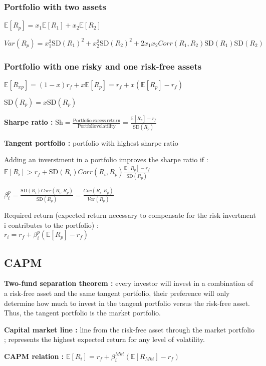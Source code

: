\documentclass[a4paper,twocolumn]{article}
\newcommand{\E}[1] {\mathbb{E} [#1] }
\newcommand{\SD} {\mathrm{SD}}
\begin{document}
\subsubsection*{Portfolio with two assets}

$\E{R_p} = x_1 \E{R_1} + x_2 \E{R_2}$

$Var(R_p) = x_1^2 \SD(R_1)^2 + x_2^2 \SD(R_2)^2 + 2 x_1 x_2 Corr(R_1, R_2) \SD(R_1) \SD(R_2)$

\subsubsection*{Portfolio with one risky and one risk-free assets}

$\E{R_{xp}} = (1-x) r_f + x \E{R_p} = r_f + x (\E{R_p} - r_f)$

$\SD(R_p) = x \SD(R_p)$

\textbf{Sharpe ratio :} $\mathrm{Sh} = \frac{\mathrm{Portfolio\ excess\ return}}{\mathrm{Portfolio volatility}} = \frac{\E{R_p} - r_f}{\SD(R_p)}$ 

\textbf{Tangent portfolio :} portfolio with highest sharpe ratio

Adding an inverstment in a portfolio improves the sharpe ratio if :\\
$\E{R_i} > r_f + \SD(R_i) Corr(R_i, R_p) \frac{\E{R_p} - r_f}{\SD(R_p)}$

$\beta_i^p = \frac{\SD(R_i) Corr(R_i, R_p)}{\SD(R_p)} = \frac{Cov(R_i, R_p)}{Var(R_p)}$

Required return (expected return necessary to compensate for the risk  invertment i contributes to the portfolio) :\\
$r_i = r_f + \beta_i^p (\E{R_p} - r_f)$

\subsection*{CAPM}

\textbf{Two-fund separation theorem :} every investor will invest in a combination of a risk-free asset and the same tangent portfolio, their preference will only determine how much to invest in the tangent portfolio versus the risk-free asset. Thus, the tangent portfolio is the market portfolio.

\textbf{Capital market line :} line from the risk-free asset through the market portfolio ; represents the highest expected return for any level of volatility.

\textbf{CAPM relation :} $\E{R_i} = r_f + \beta^{Mkt}_i (\E{R_{Mkt}} - r_f)$
\end{document}
